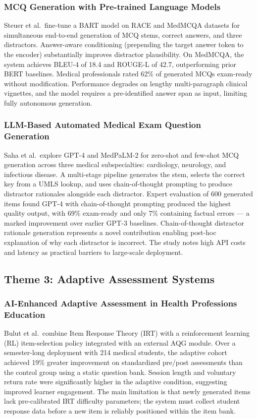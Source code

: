 \documentclass[conference]{IEEEtran}
\begin{document}
\subsubsection{MCQ Generation with Pre-trained Language Models~\cite{steuer2021mcq}}
Steuer et al.\ fine-tune a BART model on RACE and MedMCQA datasets for simultaneous end-to-end generation of MCQ stems, correct answers, and three distractors. Answer-aware conditioning (prepending the target answer token to the encoder) substantially improves distractor plausibility. On MedMCQA, the system achieves BLEU-4 of 18.4 and ROUGE-L of 42.7, outperforming prior BERT baselines. Medical professionals rated 62\% of generated MCQs exam-ready without modification. Performance degrades on lengthy multi-paragraph clinical vignettes, and the model requires a pre-identified answer span as input, limiting fully autonomous generation.

\subsubsection{LLM-Based Automated Medical Exam Question Generation~\cite{saha2023llm}}
Saha et al.\ explore GPT-4 and MedPaLM-2 for zero-shot and few-shot MCQ generation across three medical subspecialties: cardiology, neurology, and infectious disease. A multi-stage pipeline generates the stem, selects the correct key from a UMLS lookup, and uses chain-of-thought prompting to produce distractor rationales alongside each distractor. Expert evaluation of 600 generated items found GPT-4 with chain-of-thought prompting produced the highest quality output, with 69\% exam-ready and only 7\% containing factual errors --- a marked improvement over earlier GPT-3 baselines. Chain-of-thought distractor rationale generation represents a novel contribution enabling post-hoc explanation of why each distractor is incorrect. The study notes high API costs and latency as practical barriers to large-scale deployment.

\subsection{Theme 3: Adaptive Assessment Systems}

\subsubsection{AI-Enhanced Adaptive Assessment in Health Professions Education~\cite{bulut2023adaptive}}
Bulut et al.\ combine Item Response Theory (IRT) with a reinforcement learning (RL) item-selection policy integrated with an external AQG module. Over a semester-long deployment with 214 medical students, the adaptive cohort achieved 19\% greater improvement on standardized pre/post assessments than the control group using a static question bank. Session length and voluntary return rate were significantly higher in the adaptive condition, suggesting improved learner engagement. The main limitation is that newly generated items lack pre-calibrated IRT difficulty parameters; the system must collect student response data before a new item is reliably positioned within the item bank.
\end{document}
